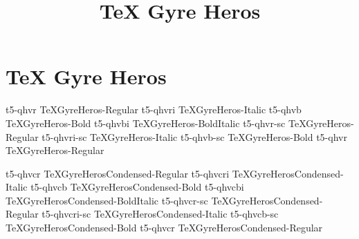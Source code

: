 \documentclass[sample]{vnsample}
\title{TeX Gyre Heros}
\begin{document}
\section{TeX Gyre Heros}
    {t5-qhvr}     {TeXGyreHeros-Regular}
   {t5-qhvri}    {TeXGyreHeros-Italic}
    {t5-qhvb}     {TeXGyreHeros-Bold}
   {t5-qhvbi}    {TeXGyreHeros-BoldItalic}
   {t5-qhvr-sc}  {TeXGyreHeros-Regular}
 {t5-qhvri-sc} {TeXGyreHeros-Italic}
   {t5-qhvb-sc}  {TeXGyreHeros-Bold}
    {t5-qhvr}     {TeXGyreHeros-Regular}

    {t5-qhvcr}     {TeXGyreHerosCondensed-Regular}
   {t5-qhvcri}    {TeXGyreHerosCondensed-Italic}
   {t5-qhvcb}     {TeXGyreHerosCondensed-Bold}
  {t5-qhvcbi}    {TeXGyreHerosCondensed-BoldItalic}
   {t5-qhvcr-sc}  {TeXGyreHerosCondensed-Regular}
 {t5-qhvcri-sc} {TeXGyreHerosCondensed-Italic}
  {t5-qhvcb-sc}  {TeXGyreHerosCondensed-Bold}
    {t5-qhvcr}     {TeXGyreHerosCondensed-Regular}
\end{document}

